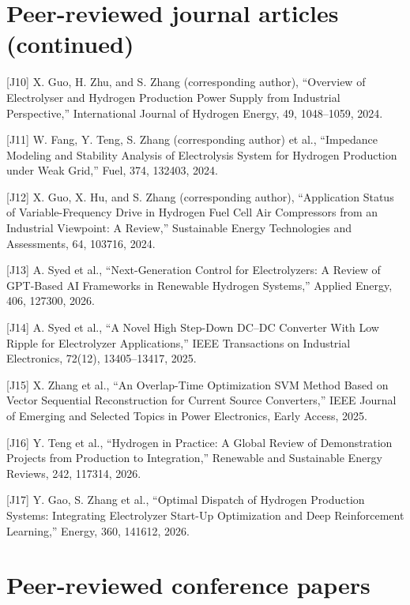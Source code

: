 \documentclass[10pt,a4paper]{article}
\begin{document}
\section*{Peer-reviewed journal articles (continued)}

[J10] X. Guo, H. Zhu, and S. Zhang (corresponding author), “Overview of Electrolyser and Hydrogen Production Power Supply from Industrial Perspective,” International Journal of Hydrogen Energy, 49, 1048–1059, 2024.\par

[J11] W. Fang, Y. Teng, S. Zhang (corresponding author) et al., “Impedance Modeling and Stability Analysis of Electrolysis System for Hydrogen Production under Weak Grid,” Fuel, 374, 132403, 2024.\par

[J12] X. Guo, X. Hu, and S. Zhang (corresponding author), “Application Status of Variable-Frequency Drive in Hydrogen Fuel Cell Air Compressors from an Industrial Viewpoint: A Review,” Sustainable Energy Technologies and Assessments, 64, 103716, 2024.\par

[J13] A. Syed et al., “Next-Generation Control for Electrolyzers: A Review of GPT-Based AI Frameworks in Renewable Hydrogen Systems,” Applied Energy, 406, 127300, 2026.\par

[J14] A. Syed et al., “A Novel High Step-Down DC–DC Converter With Low Ripple for Electrolyzer Applications,” IEEE Transactions on Industrial Electronics, 72(12), 13405–13417, 2025.\par

[J15] X. Zhang et al., “An Overlap-Time Optimization SVM Method Based on Vector Sequential Reconstruction for Current Source Converters,” IEEE Journal of Emerging and Selected Topics in Power Electronics, Early Access, 2025.\par

[J16] Y. Teng et al., “Hydrogen in Practice: A Global Review of Demonstration Projects from Production to Integration,” Renewable and Sustainable Energy Reviews, 242, 117314, 2026.\par

[J17] Y. Gao, S. Zhang et al., “Optimal Dispatch of Hydrogen Production Systems: Integrating Electrolyzer Start-Up Optimization and Deep Reinforcement Learning,” Energy, 360, 141612, 2026.\par

\section*{Peer-reviewed conference papers}
\end{document}
